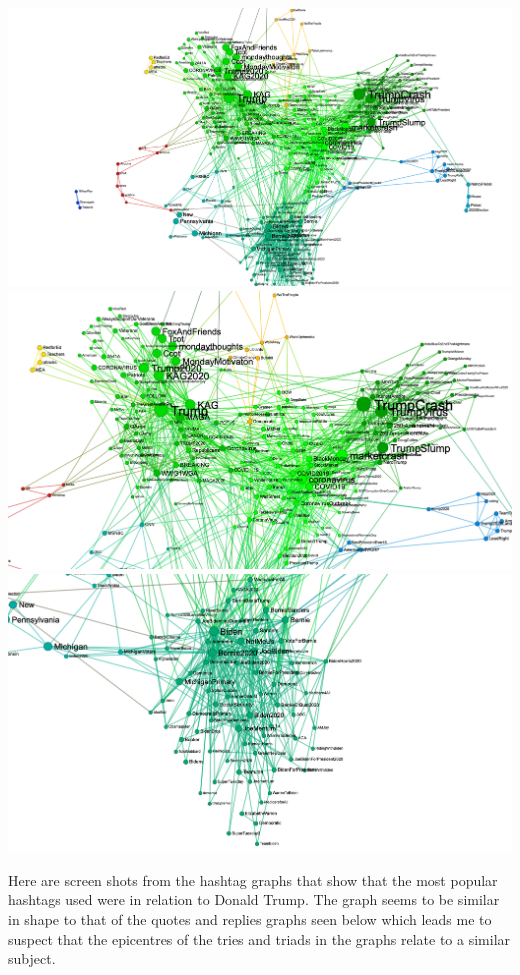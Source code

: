 \documentclass[10pt,a4paper]{article}
\begin{document}
	
	\includegraphics[width=\textwidth]{images/whole_hashtags_graph.png} 
	\includegraphics[width=\textwidth]{images/trump_hashtags.png}
	\includegraphics[width=\textwidth]{images/democrat_hashtags.png} 
	
	Here are screen shots from the hashtag graphs that show that the most popular hashtags used were in relation to Donald Trump. The graph seems to be similar in shape to that of the quotes and replies graphs seen below which leads me to suspect that the epicentres of the tries and triads in the graphs relate to a similar subject.
	
\end{document}
